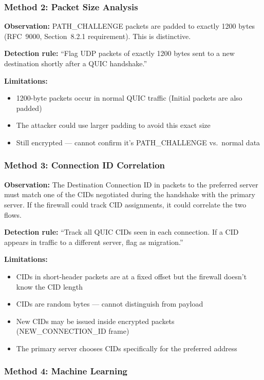 \documentclass[11pt,a4paper]{article}
\begin{document}
\subsubsection{Method 2: Packet Size Analysis}

\textbf{Observation:} PATH\_CHALLENGE packets are padded to exactly 1200 bytes (RFC~9000, Section~8.2.1 requirement). This is distinctive.

\textbf{Detection rule:} ``Flag UDP packets of exactly 1200 bytes sent to a new destination shortly after a QUIC handshake.''

\textbf{Limitations:}
\begin{itemize}
    \item 1200-byte packets occur in normal QUIC traffic (Initial packets are also padded)
    \item The attacker could use larger padding to avoid this exact size
    \item Still encrypted --- cannot confirm it's PATH\_CHALLENGE vs.\ normal data
\end{itemize}

\subsubsection{Method 3: Connection ID Correlation}

\textbf{Observation:} The Destination Connection ID in packets to the preferred server must match one of the CIDs negotiated during the handshake with the primary server. If the firewall could track CID assignments, it could correlate the two flows.

\textbf{Detection rule:} ``Track all QUIC CIDs seen in each connection. If a CID appears in traffic to a different server, flag as migration.''

\textbf{Limitations:}
\begin{itemize}
    \item CIDs in short-header packets are at a fixed offset but the firewall doesn't know the CID length
    \item CIDs are random bytes --- cannot distinguish from payload
    \item New CIDs may be issued inside encrypted packets (NEW\_CONNECTION\_ID frame)
    \item The primary server chooses CIDs specifically for the preferred address
\end{itemize}

\subsubsection{Method 4: Machine Learning}
\end{document}
